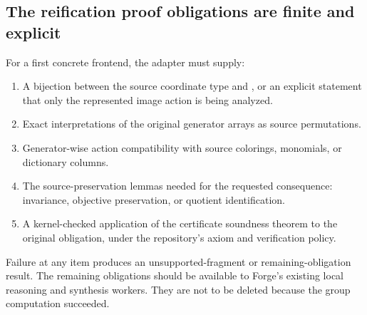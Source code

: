 \subsection{The reification proof obligations are finite and explicit}
For a first concrete frontend, the adapter must supply:
\begin{enumerate}
\item A bijection between the source coordinate type and , or an explicit statement that only the represented image action is being analyzed.
\item Exact interpretations of the original generator arrays as source permutations.
\item Generator-wise action compatibility with source colorings, monomials, or dictionary columns.
\item The source-preservation lemmas needed for the requested consequence: invariance, objective preservation, or quotient identification.
\item A kernel-checked application of the certificate soundness theorem to the original obligation, under the repository's axiom and verification policy.
\end{enumerate}
Failure at any item produces an unsupported-fragment or remaining-obligation result. The remaining obligations should be available to Forge's existing local reasoning and synthesis workers. They are not to be deleted because the group computation succeeded.
